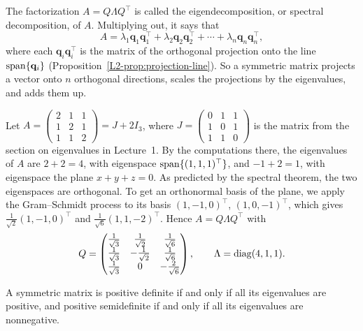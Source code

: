 The factorization $A = Q\Lambda Q^\top$ is called the eigendecomposition, or spectral decomposition, of $A$. Multiplying out, it says that
\[A = \lambda_1 \mathbf{q}_1 \mathbf{q}_1^\top + \lambda_2 \mathbf{q}_2 \mathbf{q}_2^\top + \cdots + \lambda_n \mathbf{q}_n \mathbf{q}_n^\top,\]
where each $\mathbf{q}_i \mathbf{q}_i^\top$ is the matrix of the orthogonal projection onto the line $\operatorname{span}\{\mathbf{q}_i\}$ (Proposition~\ref{L2-prop:projection-line}). So a symmetric matrix projects a vector onto $n$ orthogonal directions, scales the projections by the eigenvalues, and adds them up.

\begin{example}\label{L2-ex:spectral}
    Let $A = \begin{pmatrix} 2 & 1 & 1 \\ 1 & 2 & 1 \\ 1 & 1 & 2 \end{pmatrix} = J + 2I_3$, where $J = \begin{pmatrix} 0 & 1 & 1 \\ 1 & 0 & 1 \\ 1 & 1 & 0 \end{pmatrix}$ is the matrix from the section on eigenvalues in Lecture~1. By the computations there, the eigenvalues of $A$ are $2 + 2 = 4$, with eigenspace $\operatorname{span}\{(1, 1, 1)^\top\}$, and $-1 + 2 = 1$, with eigenspace the plane $x + y + z = 0$. As predicted by the spectral theorem, the two eigenspaces are orthogonal. To get an orthonormal basis of the plane, we apply the Gram--Schmidt process to its basis $(1, -1, 0)^\top$, $(1, 0, -1)^\top$, which gives $\frac{1}{\sqrt{2}}(1, -1, 0)^\top$ and $\frac{1}{\sqrt{6}}(1, 1, -2)^\top$. Hence $A = Q\Lambda Q^\top$ with
    \[Q = \begin{pmatrix} \frac{1}{\sqrt{3}} & \frac{1}{\sqrt{2}} & \frac{1}{\sqrt{6}} \\ \frac{1}{\sqrt{3}} & -\frac{1}{\sqrt{2}} & \frac{1}{\sqrt{6}} \\ \frac{1}{\sqrt{3}} & 0 & -\frac{2}{\sqrt{6}} \end{pmatrix}, \qquad \Lambda = \operatorname{diag}(4, 1, 1).\]
\end{example}

\begin{corollary}\label{L2-cor:spd-eigenvalues}
    A symmetric matrix is positive definite if and only if all its eigenvalues are positive, and positive semidefinite if and only if all its eigenvalues are nonnegative.
\end{corollary}

